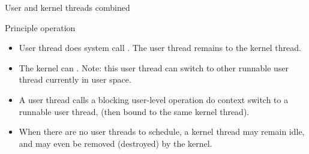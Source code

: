   \begin{slide}{User and kernel threads combined}
    \begin{block}{Principle operation}
      \begin{itemize}%
      \item User thread does system call \mathexpr{\Rightarrow} . The user thread remains  to the kernel thread.
      \item The kernel can . Note: this user thread can switch to  other runnable user thread currently in user
        space.
      \item A user thread calls a blocking user-level operation \mathexpr{\Rightarrow} do context switch
        to a runnable user thread, (then bound to the same kernel thread).
      \item When there are no user threads to schedule, a kernel thread may remain idle, and may even be
        removed (destroyed) by the kernel.
      \end{itemize}
    \end{block}
  \end{slide}
